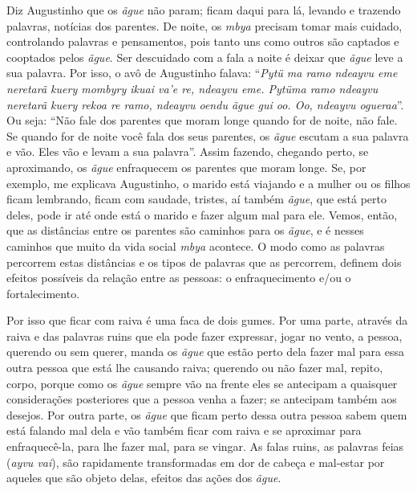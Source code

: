 Diz Augustinho que os \emph{ãgue} não param; ficam daqui para lá, levando e
trazendo palavras, notícias dos parentes. De noite, os \emph{mbya} precisam
tomar mais cuidado, controlando palavras e pensamentos, pois tanto uns
como outros são captados e cooptados pelos \emph{ãgue}. Ser descuidado com a
fala a noite é deixar que \emph{ãgue} leve a sua palavra. Por isso, o avô de
Augustinho falava: ``\emph{Pytü ma ramo ndeayvu eme neretarã kuery mombyry
ikuai va’e re, ndeayvu eme. Pytüma ramo ndeayvu neretarã kuery rekoa re
ramo, ndeayvu oendu ãgue gui oo. Oo, ndeayvu ogueraa}''. Ou seja: ``Não
fale dos parentes que moram longe quando for de noite, não fale. Se
quando for de noite você fala dos seus parentes, os \emph{ãgue} escutam a sua
palavra e vão. Eles vão e levam a sua palavra''. Assim fazendo, chegando
perto, se aproximando, os \emph{ãgue} enfraquecem os parentes que moram longe.
Se, por exemplo, me explicava Augustinho, o marido está viajando e a
mulher ou os filhos ficam lembrando, ficam com saudade, tristes, aí
também \emph{ãgue}, que está perto deles, pode ir até onde está o marido e fazer
algum mal para ele. Vemos, então, que as distâncias entre os parentes
são caminhos para os \emph{ãgue}, e é nesses caminhos que muito da vida social
\emph{mbya} acontece. O modo como as palavras percorrem estas distâncias e
os tipos de palavras que as percorrem, definem dois efeitos possíveis
da relação entre as pessoas: o enfraquecimento e/ou o fortalecimento.

Por isso que ficar com raiva é uma faca de dois gumes. Por uma parte,
através da raiva e das palavras ruins que ela pode fazer expressar,
jogar no vento, a pessoa, querendo ou sem querer, manda os \emph{ãgue} que
estão perto dela fazer mal para essa outra pessoa que está lhe causando
raiva; querendo ou não fazer mal, repito, corpo, porque como os \emph{ãgue}
sempre vão na frente eles se antecipam a quaisquer considerações
posteriores que a pessoa venha a fazer; se antecipam também aos
desejos. Por outra parte, os \emph{ãgue} que ficam perto dessa outra pessoa
sabem quem está falando mal dela e vão também ficar com raiva e se
aproximar para enfraquecê-la, para lhe fazer mal, para se vingar. As
falas ruins, as palavras feias (\emph{ayvu vai}), são rapidamente
transformadas em dor de cabeça e mal-estar por aqueles que são objeto
delas, efeitos das ações dos \emph{ãgue}.

